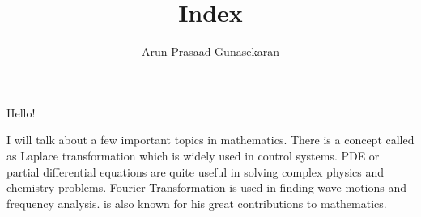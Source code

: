 \documentclass[10pt,a4paper]{article}
\author{Arun Prasaad Gunasekaran}
\title{Index}
\begin{document}
\maketitle

Hello!

I will talk about a few important topics in mathematics. There is a concept called as   Laplace transformation which is widely used in control systems. \newpage
{} PDE or partial differential equations are quite useful in solving complex physics and chemistry problems.  Fourier Transformation is used in finding wave motions and frequency analysis.  is also known for his great contributions to mathematics.

\printindex
\end{document}
